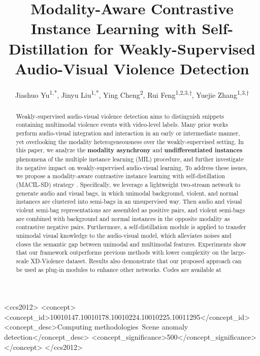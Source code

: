 \documentclass[sigconf]{acmart}
\begin{document}
\title{Modality-Aware Contrastive Instance Learning with Self-Distillation for Weakly-Supervised Audio-Visual Violence Detection}

\author{Jiashuo Yu\textsuperscript{1,*}\authornotemark[1], Jinyu Liu\textsuperscript{1,*}\authornotemark[1], Ying Cheng\textsuperscript{2}, Rui Feng\textsuperscript{1,2,3,$\dagger$}\authornotemark[2], Yuejie Zhang\textsuperscript{1,3,$\dagger$}\authornotemark[2]}



\begin{abstract}
Weakly-supervised audio-visual violence detection aims to distinguish snippets containing multimodal violence events with video-level labels. Many prior works perform audio-visual integration and interaction in an early or intermediate manner, yet overlooking the modality heterogeneousness over the weakly-supervised setting. In this paper, we analyze the \textbf{modality asynchrony} and \textbf{undifferentiated instances} phenomena of the multiple instance learning (MIL) procedure, and further investigate its negative impact on weakly-supervised audio-visual learning. To address these issues, we propose a modality-aware contrastive instance learning with self-distillation (MACIL-SD) strategy . Specifically, we leverage a lightweight two-stream network to generate audio and visual bags, in which unimodal background, violent, and normal instances are clustered into semi-bags in an unsupervised way. Then audio and visual violent semi-bag representations are assembled as positive pairs, and violent semi-bags are combined with background and normal instances in the opposite modality as contrastive negative pairs. Furthermore, a self-distillation module is applied to transfer unimodal visual knowledge to the audio-visual model, which alleviates noises and closes the semantic gap between unimodal and multimodal features. Experiments show that our framework outperforms previous methods with lower complexity on the large-scale XD-Violence dataset. Results also demonstrate that our proposed approach can be used as plug-in modules to enhance other networks. Codes are available at 
\end{abstract}
\begin{CCSXML}
<ccs2012>
   <concept>
       <concept_id>10010147.10010178.10010224.10010225.10011295</concept_id>
       <concept_desc>Computing methodologies~Scene anomaly detection</concept_desc>
       <concept_significance>500</concept_significance>
       </concept>
 </ccs2012>
\end{CCSXML}
\end{document}
